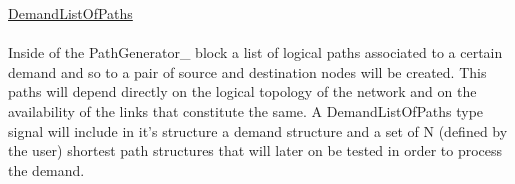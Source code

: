 \underline{DemandListOfPaths}\\
\\
Inside of the PathGenerator\_  block a list of logical paths associated to a certain demand and so to a pair of source and destination nodes will be created. This paths will depend directly on the logical topology of the network and on the availability of the links that constitute the same. A DemandListOfPaths type signal will include in it's structure a demand structure and a set of N (defined by the user) shortest path structures that will later on be tested in order to process the demand. 


